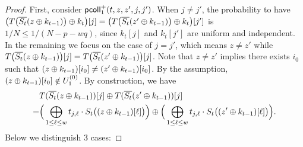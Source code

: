 \begin{proof}
	First, consider $\mathsf{pcoll}_{1}^+(t,z,z',j,j')$. When $j\neq j'$, the probability to have
	$\big(T\big(\overline{S_t}(z\oplus k_{t-1})\big)\oplus k_t\big)[j]=\big(T\big(\overline{S_t}(z'\oplus k_{t-1})\big)\oplus k_t\big)[j']$ is $1/N\leq 1/(N-p-wq)$, since $k_t[j]$ and $k_t[j']$ are uniform and independent. In the remaining we focus on the case of $j=j'$, which means $z\neq z'$ while $T\big(\overline{S_t}(z\oplus k_{t-1})\big)[j]=T\big(\overline{S_t}(z'\oplus k_{t-1})\big)[j]$. Note that $z\neq z'$ implies there exists $i_0$ such that $(z\oplus k_{t-1})[i_0]\neq(z'\oplus k_{t-1})[i_0]$. By the assumption, $(z\oplus k_{t-1})[i_0]\notin U_1^{(0)}$. By construction, we have
	\begin{align*}
	&  T(\overline{S_t}(z\oplus k_{t-1}))[j]\oplus T(\overline{S_t}(z'\oplus k_{t-1}))[j]       \\
	= &
	\Big(\bigoplus_{1\leq\ell\leq w}t_{j,\ell}\cdot S_t\big((z\oplus k_{t-1})[\ell]\big)\Big)\oplus
	\Big(\bigoplus_{1\leq\ell\leq w}t_{j,\ell}\cdot S_t\big((z'\oplus k_{t-1})[\ell]\big)\Big)   .
	\end{align*}
	Below we distinguish 3 cases:
	

\end{proof}
